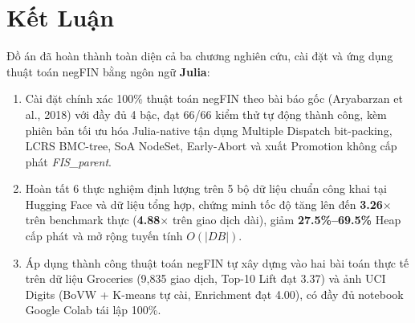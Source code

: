 \documentclass[conference]{IEEEtran}
\begin{document}
\begin{table}[htbp]
\caption{Danh mục tài nguyên công khai phục vụ tái thực hiện đồ án}
\label{tab:repro}
\centering
{}
\end{table}

\FloatBarrier
\section{Kết Luận}
Đồ án đã hoàn thành toàn diện cả ba chương nghiên cứu, cài đặt và ứng dụng thuật toán negFIN bằng ngôn ngữ \textbf{Julia}:
\begin{enumerate}
    \item Cài đặt chính xác 100\% thuật toán negFIN theo bài báo gốc (Aryabarzan et al., 2018) với đầy đủ 4 bậc, đạt 66/66 kiểm thử tự động thành công, kèm phiên bản tối ưu hóa Julia-native tận dụng Multiple Dispatch bit-packing, LCRS BMC-tree, SoA NodeSet, Early-Abort và xuất Promotion không cấp phát \textit{FIS\_parent}.
    \item Hoàn tất 6 thực nghiệm định lượng trên 5 bộ dữ liệu chuẩn công khai tại Hugging Face và dữ liệu tổng hợp, chứng minh tốc độ tăng lên đến \textbf{3.26$\times$} trên benchmark thực (\textbf{4.88$\times$} trên giao dịch dài), giảm \textbf{27.5\%--69.5\%} Heap cấp phát và mở rộng tuyến tính $O(|DB|)$.
    \item Áp dụng thành công thuật toán negFIN tự xây dựng vào hai bài toán thực tế trên dữ liệu Groceries (9,835 giao dịch, Top-10 Lift đạt 3.37) và ảnh UCI Digits (BoVW + K-means tự cài, Enrichment đạt 4.00), có đầy đủ notebook Google Colab tái lập 100\%.
\end{enumerate}
\end{document}
